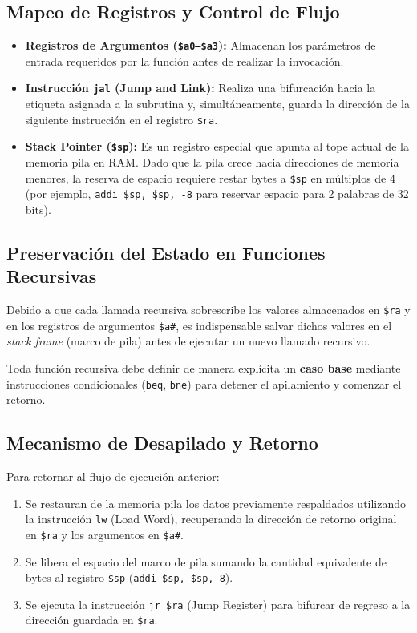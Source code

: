 \documentclass[12pt,a4paper]{article}
\begin{document}
\subsection{Mapeo de Registros y Control de Flujo}
\begin{itemize}
    \item \textbf{Registros de Argumentos (\texttt{\$a0--\$a3}):} Almacenan los parámetros de entrada requeridos por la función antes de realizar la invocación.
    \item \textbf{Instrucción \texttt{jal} (Jump and Link):} Realiza una bifurcación hacia la etiqueta asignada a la subrutina y, simultáneamente, guarda la dirección de la siguiente instrucción en el registro \texttt{\$ra}.
    \item \textbf{Stack Pointer (\texttt{\$sp}):} Es un registro especial que apunta al tope actual de la memoria pila en RAM. Dado que la pila crece hacia direcciones de memoria menores, la reserva de espacio requiere restar bytes a \texttt{\$sp} en múltiplos de 4 (por ejemplo, \texttt{addi \$sp, \$sp, -8} para reservar espacio para 2 palabras de 32 bits).
\end{itemize}

\subsection{Preservación del Estado en Funciones Recursivas}
Debido a que cada llamada recursiva sobrescribe los valores almacenados en \texttt{\$ra} y en los registros de argumentos \texttt{\$a\#}, es indispensable salvar dichos valores en el \textit{stack frame} (marco de pila) antes de ejecutar un nuevo llamado recursivo. 

Toda función recursiva debe definir de manera explícita un \textbf{caso base} mediante instrucciones condicionales (\texttt{beq}, \texttt{bne}) para detener el apilamiento y comenzar el retorno.

\subsection{Mecanismo de Desapilado y Retorno}
Para retornar al flujo de ejecución anterior:
\begin{enumerate}
    \item Se restauran de la memoria pila los datos previamente respaldados utilizando la instrucción \texttt{lw} (Load Word), recuperando la dirección de retorno original en \texttt{\$ra} y los argumentos en \texttt{\$a\#}.
    \item Se libera el espacio del marco de pila sumando la cantidad equivalente de bytes al registro \texttt{\$sp} (\texttt{addi \$sp, \$sp, 8}).
    \item Se ejecuta la instrucción \texttt{jr \$ra} (Jump Register) para bifurcar de regreso a la dirección guardada en \texttt{\$ra}.
\end{enumerate}
\end{document}
